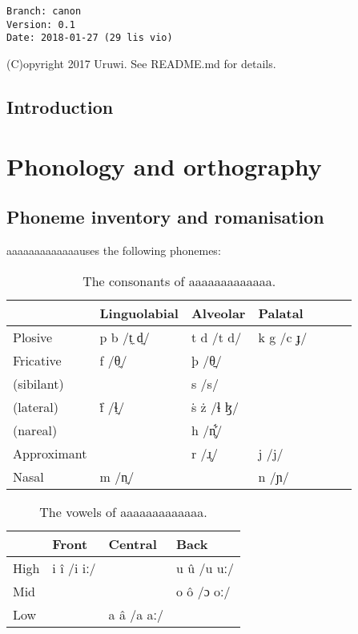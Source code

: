 \documentclass{book}
\newcommand{\lname}{aaaaaaaaaaaaa}
\begin{document}
\begin{verbatim}
Branch: canon
Version: 0.1
Date: 2018-01-27 (29 lis vio)
\end{verbatim}

(C)opyright 2017 Uruwi. See README.md for details.

\tableofcontents

\section{Introduction}

\chapter{Phonology and orthography}

\section{Phoneme inventory and romanisation}

\lname uses the following phonemes:

\begin{table}[h]
  \caption{The consonants of \lname{}.}
  \centering
  \begin{tabular}{l|llllll}
      & Linguolabial & Alveolar & Palatal \\
      \hline
      Plosive & p b /t̼ d̼/ & t d /t d/ & k g /c ɟ/ \\
      Fricative & f /θ̼/ & þ /θ̠/ & \\
      (sibilant) & & s /s/ & \\
      (lateral) & ḟ /ɬ̼/ & ṡ ż /ɬ ɮ/ & \\
      (nareal) & & h /n̥͋/ & \\
      Approximant & & r /ɹ̥/ & j /j/ \\
      Nasal & m /n̼/ & & n /ɲ/ \\
  \end{tabular}
\end{table}
\begin{table}[h]
\centering
  \caption{The vowels of \lname.}
  \begin{tabular}{l|lll}
    & Front & Central & Back \\
    \hline
    High & i î /i iː/ & & u û /u uː/ \\
    Mid & & & o ô /ɔ oː/ \\
    Low & & a â /a aː/ & \\
  \end{tabular}
\end{table}
\end{document}
